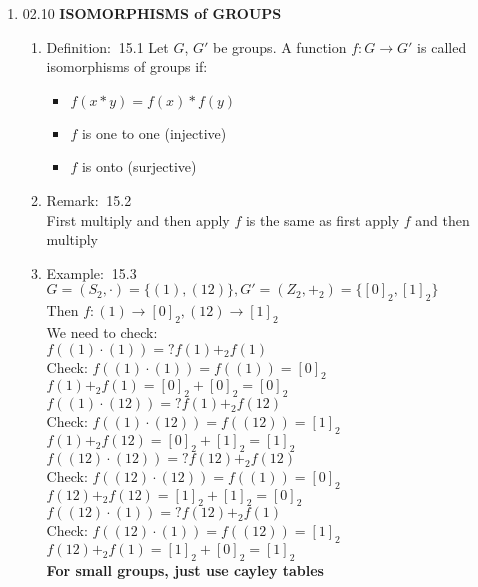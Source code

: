 \documentclass[12pt]{article}
\newcommand{\defi}{{\color{blue} Definition: $\ $}}
\newcommand{\exe}{{\color{green} Example: $\ $}}
\newcommand{\rem}{{\color{blue} Remark: $\ $}}
\begin{document}
\begin{enumerate}
\begin{enumerate}
\begin{proof}
        \end{proof}
        
    \end{enumerate}
    \item 02.10 
    \textbf{ ISOMORPHISMS of GROUPS}
    \begin{enumerate}
        \item \defi 15.1 Let $G$, $G'$ be groups. A function $f: G\rightarrow G'$ is called isomorphisms of groups if:
        \begin{itemize}
            \item $f(x*y) = f(x)*f(y)$
            \item $f$ is one to one (injective)
            \item $f$ is onto (surjective)
        \end{itemize}
        \item \rem 15.2\\
        First multiply and then apply $f$ is the same as first apply $f$ and then multiply
        \item \exe 15.3\\
        $G = (S_2, \cdot) = \{(1),(12)\}, G' = (Z_2, +_2) = \{[0]_2, [1]_2\}$\\
        Then $f: (1) \rightarrow [0]_2, (12) \rightarrow [1]_2$\\
        We need to check:\\
        $f((1)\cdot(1)) =? f(1)+_2f(1)$\\
        Check: $f((1)\cdot(1)) = f((1)) = [0]_2$\\
        $f(1)+_2f(1) = [0]_2 + [0]_2 = [0]_2 $\\
        $f((1)\cdot(12)) =? f(1)+_2f(12)$\\
        Check: $f((1)\cdot(12)) = f((12)) = [1]_2$\\
        $f(1)+_2f(12) = [0]_2 + [1]_2 = [1]_2 $\\
        $f((12)\cdot(12)) =? f(12)+_2f(12)$\\
        Check: $f((12)\cdot(12)) = f((1)) = [0]_2$\\
        $f(12)+_2f(12) = [1]_2 + [1]_2 = [0]_2 $\\
        $f((12)\cdot(1)) =? f(12)+_2f(1)$\\
        Check: $f((12)\cdot(1)) = f((12)) = [1]_2$\\
        $f(12)+_2f(1) = [1]_2 + [0]_2 = [1]_2 $\\
        \textbf{For small groups, just use cayley tables}\\

\end{enumerate}
\end{enumerate}
\end{document}
